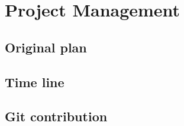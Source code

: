 \newpage
\section{Project Management}
\subsection{Original plan}
\subsection{Time line}
\subsection{Git contribution}